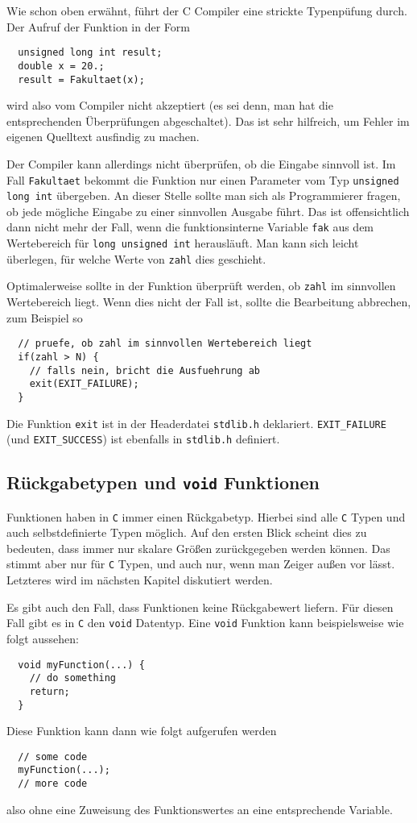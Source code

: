 Wie schon oben erwähnt, führt der C Compiler eine strickte Typenpüfung durch.
Der Aufruf der Funktion in der Form
\begin{lstlisting}
  unsigned long int result;
  double x = 20.;
  result = Fakultaet(x);
\end{lstlisting}
wird also vom Compiler nicht akzeptiert (es sei denn, man hat die entsprechenden Überprüfungen abgeschaltet).
Das ist sehr hilfreich, um Fehler im eigenen Quelltext ausfindig zu machen.

Der Compiler kann allerdings nicht überprüfen, ob die Eingabe sinnvoll ist.
Im Fall \verb|Fakultaet| bekommt die Funktion nur einen Parameter vom Typ \verb|unsigned long int| übergeben. 
An dieser Stelle sollte man sich als Programmierer fragen, ob jede mögliche Eingabe zu einer sinnvollen Ausgabe führt. 
Das ist offensichtlich dann nicht mehr der Fall, wenn die funktionsinterne Variable \verb|fak| aus dem Wertebereich für \verb|long unsigned int| herausläuft. 
Man kann sich leicht überlegen, für welche Werte von \verb|zahl| dies geschieht.

Optimalerweise sollte in der Funktion überprüft werden, ob \verb|zahl| im sinnvollen Wertebereich liegt. 
Wenn dies nicht der Fall ist, sollte die Bearbeitung abbrechen, zum Beispiel so
\begin{lstlisting}
  // pruefe, ob zahl im sinnvollen Wertebereich liegt
  if(zahl > N) {
    // falls nein, bricht die Ausfuehrung ab
    exit(EXIT_FAILURE);
  }
\end{lstlisting}
Die Funktion \verb|exit| ist in der Headerdatei \verb|stdlib.h| deklariert.
\verb|EXIT_FAILURE| (und \verb|EXIT_SUCCESS|) ist ebenfalls in \verb|stdlib.h| definiert.

\subsection{Rückgabetypen und \texttt{void} Funktionen}

Funktionen haben in \texttt{C} immer einen Rückgabetyp.
Hierbei sind alle \texttt{C} Typen und auch selbstdefinierte Typen möglich.
Auf den ersten Blick scheint dies zu bedeuten, dass immer nur skalare Größen zurückgegeben werden können.
Das stimmt aber nur für \texttt{C} Typen, und auch nur, wenn man Zeiger außen vor lässt.
Letzteres wird im nächsten Kapitel diskutiert werden.

Es gibt auch den Fall, dass Funktionen keine Rückgabewert liefern.
Für diesen Fall gibt es in \texttt{C} den \verb|void| Datentyp.
Eine \verb|void| Funktion kann beispielsweise wie folgt aussehen:
\begin{lstlisting}
  void myFunction(...) {
    // do something
    return;
  }
\end{lstlisting}
Diese Funktion kann dann wie folgt aufgerufen werden
\begin{lstlisting}
  // some code
  myFunction(...);
  // more code
\end{lstlisting}
also ohne eine Zuweisung des Funktionswertes an eine entsprechende Variable.
\endinput
